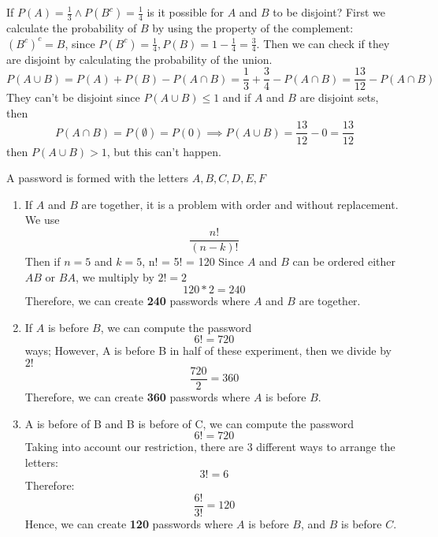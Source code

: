 \documentclass{article}
\begin{document}
    \begin{minipage}{\linewidth}
        \hspace*{-\parindent}
        \begin{solutions}
            If $P(A) = \frac{1}{3} \land P(B^c) = \frac{1}{4}$ is it possible for $A$ and $B$ to be disjoint? First we calculate the probability of $B$ by using the property of the complement: $(B^c)^c = B$, since $P(B^c) = \frac{1}{4}, P(B) = 1 - \frac{1}{4} = \frac{3}{4}$. Then we can check if they are disjoint by calculating the probability of the union.
            \[
                P(A \cup B) = P(A) + P(B) - P(A \cap B) = \frac{1}{3} + \frac{3}{4} - P(A \cap B)= \frac{13}{12} - P(A \cap B) 
            \]
            They can't be disjoint since $P(A \cup B) \leq 1$ and if $A$ and $B$ are disjoint sets, then
            \[
                P(A \cap B) = P(\emptyset) = P(0) \implies P(A \cup B) = \frac{13}{12} - 0 = \frac{13}{12}
            \]
            then $P(A \cup B) > 1$, but this can't happen.
            \medskip           
        \end{solutions}
    
    
        \begin{solutions}
        A password is formed with the letters ${A, B, C, D, E, F}$
            \begin{enumerate}[label=\alph*)]
                \item If $A$ and $B$ are together, it is a problem with order and without replacement. We use 
                \[
                \frac{n!}{(n-k)!}
                \]
                Then if $n=5$ and $k=5$,
               n! = 5! = 120               
                Since $A$ and $B$ can be ordered either $AB$ or $BA$, we multiply by $2! = 2$
                 \[
                 120 * 2 = 240
                 \]
                Therefore, we can create \textbf{240} passwords where $A$ and $B$ are together.
                
                \item If $A$ is before $B$, we can compute the password 
                \[
                6! = 720 
                \] ways;
                However, A is before B in half of these experiment, then we divide by $2!$
                \[
                \frac{720}{2} = 360
                \]
                Therefore, we can create \textbf{360} passwords where $A$ is before $B$.
                
                \item A is before of B and B is before of C, we can compute the password
                \[
                6! = 720
                \]
                Taking into account our restriction, there are 3 different ways to arrange the letters: 
                \[
                3! = 6
                \]
                Therefore:
                \[
                \frac{6!}{3!} = 120
                \]
                Hence, we can create \textbf{120} passwords where $A$ is before $B$, and $B$ is before $C$.
                

\end{enumerate}
\end{solutions}
\end{minipage}
\end{document}

